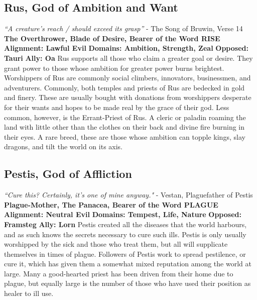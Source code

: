 \subsection{Rus, God of Ambition and Want}\label{god:rus}
\textit{“A creature’s reach / should exceed its grasp”}
\break
\hspace*{\fill}- The Song of Bruwin, Verse 14
\break
\break
\textbf{The Overthrower, Blade of Desire, Bearer of the Word RISE}\break
\hspace*{\fill}\break
\textbf{Alignment:\hspace*{\fill} Lawful Evil} \break
\textbf{Domains:\hspace*{\fill} Ambition, Strength, Zeal} \break
\textbf{Opposed:\hspace*{\fill} Tauri} \break
\textbf{Ally:\hspace*{\fill} Oa} \break
\hspace*{\fill}\break
Rus supports all those who claim a greater goal or desire. They grant power to those whose ambition for greater power burns brightest. Worshippers of Rus are commonly social climbers, innovators, businessmen, and adventurers.\newline
Commonly, both temples and priests of Rus are bedecked in gold and finery.  These are usually bought with donations from worshippers desperate for their wants and hopes to be made real by the grace of their god. \newline
Less common, however, is the Errant-Priest of Rus. A cleric or paladin roaming the land with little other than the clothes on their back and divine fire burning in their eyes. A rare breed, these are those whose ambition can topple kings, slay dragons, and tilt the world on its axis.

\subsection{Pestis, God of Affliction}\label{god:pestis}
\textit{“Cure this? Certainly, it’s one of mine anyway."}
\break
\hspace*{\fill}- Vestan, Plaguefather of Pestis
\break
\break
\textbf{Plague-Mother, The Panacea, Bearer of the Word PLAGUE}\break
\hspace*{\fill}\break
\textbf{Alignment:\hspace*{\fill} Neutral Evil} \break
\textbf{Domains:\hspace*{\fill} Tempest, Life, Nature} \break
\textbf{Opposed:\hspace*{\fill} Framsteg} \break
\textbf{Ally:\hspace*{\fill} Lorn} \break
\hspace*{\fill}\break
Pestis created all the diseases that the world harbours, and as such knows the secrets necessary to cure such ills. Pestis is only usually worshipped by the sick and those who treat them, but all will supplicate themselves in times of plague.\newline 
Followers of Pestis work to spread pestilence, or cure it, which has given them a somewhat mixed reputation among the world at large. Many a good-hearted priest has been driven from their home due to plague, but equally large is the number of those who have used their position as healer to ill use. 

